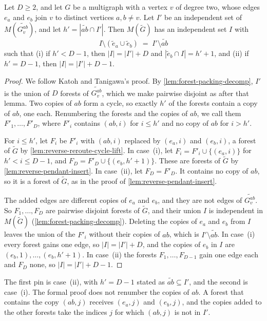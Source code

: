 \begin{lemma}
  \label{lem:edge-splitting}
  \leanok
  Let $D \ge 2$, and let $G$ be a multigraph with a vertex $v$ of degree
  two, whose edges $e_a$ and $e_b$ join $v$ to distinct vertices
  $a, b \neq v$. Let $I'$ be an independent set of
  $M(\widetilde{G_v^{ab}})$, and let $h' = |\widetilde{ab} \cap I'|$.
  Then $M(\tilde G)$ has an independent set $I$ with
  \[
    I \setminus (\tilde e_a \cup \tilde e_b) \;=\;
    I' \setminus \widetilde{ab}
  \]
  such that (i) if $h' < D - 1$, then $|I| = |I'| + D$ and
  $|\tilde e_b \cap I| = h' + 1$, and (ii) if $h' = D - 1$, then
  $|I| = |I'| + D - 1$.
\end{lemma}
\begin{proof}
  \leanok
  We follow Katoh and Tanigawa's proof. By
  \cref{lem:forest-packing-decomp}, $I'$ is the union of $D$ forests of
  $\widetilde{G_v^{ab}}$, which we make pairwise disjoint as after that
  lemma. Two copies of $ab$ form a cycle, so exactly $h'$ of the forests
  contain a copy of $ab$, one each. Renumbering the forests and the
  copies of $ab$, we call them $F'_1, \dots, F'_D$, where $F'_i$ contains
  $(ab, i)$ for $i \le h'$ and no copy of $ab$ for $i > h'$.

  For $i \le h'$, let $F_i$ be $F'_i$ with $(ab, i)$ replaced by
  $(e_a, i)$ and $(e_b, i)$, a forest of $\tilde G$ by
  \cref{lem:reverse-reroute-cycle-lift}. In case~(i), let
  $F_i = F'_i \cup \{(e_a, i)\}$ for $h' < i \le D - 1$, and
  $F_D = F'_D \cup \{(e_b, h' + 1)\}$. These are forests of $\tilde G$ by
  \cref{lem:reverse-pendant-insert}. In case~(ii), let $F_D = F'_D$. It
  contains no copy of $ab$, so it is a forest of $\tilde G$, as in the
  proof of \cref{lem:reverse-pendant-insert}.

  The added edges are different copies of $e_a$ and $e_b$, and they are
  not edges of $\widetilde{G_v^{ab}}$. So $F_1, \dots, F_D$ are pairwise
  disjoint forests of $\tilde G$, and their union $I$ is independent in
  $M(\tilde G)$ (\cref{lem:forest-packing-decomp}). Deleting the copies
  of $e_a$ and $e_b$ from $I$ leaves the union of the $F'_i$ without
  their copies of $ab$, which is $I' \setminus \widetilde{ab}$. In
  case~(i) every forest gains one edge, so $|I| = |I'| + D$, and the
  copies of $e_b$ in $I$ are $(e_b, 1), \dots, (e_b, h' + 1)$. In
  case~(ii) the forests $F_1, \dots, F_{D-1}$ gain one edge each and
  $F_D$ none, so $|I| = |I'| + D - 1$.
\end{proof}
\begin{fmlnote}
  The first pin is case~(ii), with $h' = D - 1$ stated as
  $\widetilde{ab} \subseteq I'$, and the second is case~(i). The formal
  proof does not renumber the copies of $ab$. A forest that contains the
  copy $(ab, j)$ receives $(e_a, j)$ and $(e_b, j)$, and the copies added
  to the other forests take the indices $j$ for which $(ab, j)$ is not in
  $I'$.
\end{fmlnote}

